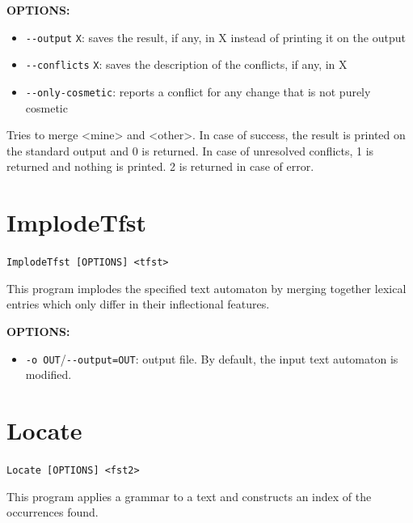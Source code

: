 \bigskip
\noindent \textbf{OPTIONS:}
\begin{itemize}
\item \verb+--output+ \verb+X+: saves the result, if any, in X instead of printing it on the output
\item \verb+--conflicts+ \verb+X+: saves the description of the conflicts, if any, in X
\item \verb+--only-cosmetic+: reports a conflict for any change that is not purely cosmetic
\end{itemize}

Tries to merge <mine> and <other>. In case of success, the result is printed on the
standard output and 0 is returned. In case of unresolved conflicts, 1 is returned and
nothing is printed. 2 is returned in case of error.



\section{ImplodeTfst}
 \verb+ImplodeTfst [OPTIONS] <tfst>+

\bigskip
\noindent This program implodes the specified text automaton by merging
together lexical entries which only differ in their inflectional features.

\bigskip
\noindent \textbf{OPTIONS:}
\begin{itemize}
  \item \verb+-o OUT+/\verb+--output=OUT+: output file. By default, the input
  text automaton is modified.
\end{itemize}






\section{Locate}
\label{section-Locate}
\verb+Locate [OPTIONS] <fst2>+

\bigskip
\noindent {}
This program applies a grammar to a text and constructs an index of the
occurrences found.

